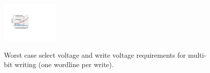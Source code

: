 

\begin{figure}%
\centering\label{fig:multiV}
  \includegraphics[width=0.25\textwidth]{./figures/multi_V_one.pdf}\\
  \caption{Worst case select voltage and write voltage requirements for multi-bit writing (one wordline per write).}\label{fig:reliable_region}
    \vspace{-10pt}
\end{figure}

